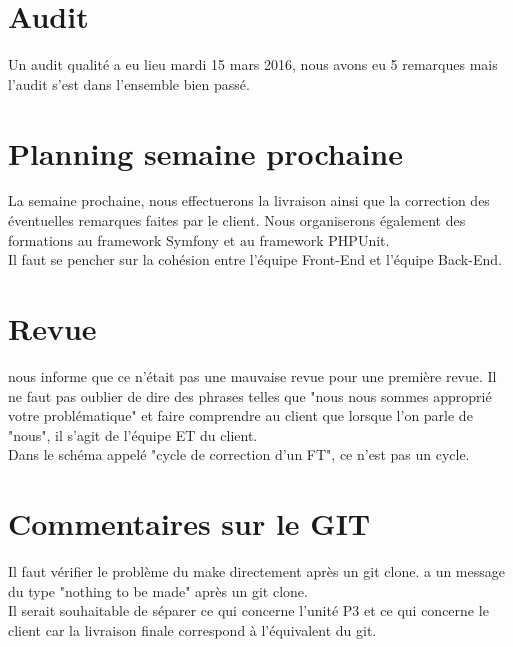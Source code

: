 \documentclass [a4paper] {article}
\begin{document}
\section{Audit}
Un audit qualité a eu lieu mardi 15 mars 2016, nous avons eu 5 remarques mais l'audit s'est dans l'ensemble bien passé.


\section{Planning semaine prochaine}
La semaine prochaine, nous effectuerons la livraison ainsi que la correction des éventuelles remarques faites par le client. Nous organiserons également des formations au framework Symfony et au framework PHPUnit. \\
Il faut se pencher sur la cohésion entre l'équipe Front-End et l'équipe Back-End.


\section{Revue}
\nomTuteurPedago{} nous informe que ce n'était pas une mauvaise revue pour une première revue. Il ne faut pas oublier de dire des phrases telles que "nous nous sommes approprié votre problématique" et faire comprendre au client que lorsque l'on parle de "nous", il s'agit de l'équipe ET du client. \\
Dans le schéma appelé "cycle de correction d'un FT", ce n'est pas un cycle.



\section{Commentaires sur le GIT}
Il faut vérifier le problème du make directement après un git clone. \nomTuteurPedago{} a un message du type "nothing to be made" après un git clone. \\
Il serait souhaitable de séparer ce qui concerne l'unité P3 et ce qui concerne le client car la livraison finale correspond à l'équivalent du git.


\newpage
\end{document}
